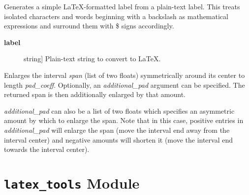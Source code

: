 \documentclass[a4paper,10pt,english]{sphinxmanual}
\begin{document}

\begin{fulllineitems}
\label{index:kafe.plot.label_to_latex}
Generates a simple LaTeX-formatted label from a plain-text label.
This treats isolated characters and words beginning with a backslash
as mathematical expressions and surround them with \$ signs accordingly.
\begin{description}
\item[{\textbf{label}}] \leavevmode{[}string{]}
Plain-text string to convert to LaTeX.

\end{description}

\end{fulllineitems}


\begin{fulllineitems}
\label{index:kafe.plot.pad_span}
Enlarges the interval \emph{span} (list of two floats) symmetrically around
its center to length \emph{pad\_coeff}. Optionally, an \emph{additional\_pad} argument
can be specified. The returned span is then additionally enlarged by that
amount.

\emph{additional\_pad} can also be a list of two floats which specifies an
asymmetric amount by which to enlarge the span. Note that in this case,
positive entries in \emph{additional\_pad} will enlarge the span (move the
interval end away from the interval center) and negative amounts will
shorten it (move the interval end towards the interval center).

\end{fulllineitems}



\section{\texttt{latex\_tools} Module}
\label{index:module-kafe.latex_tools}\label{index:latex-tools-module}\label{index:module-latex_tools}
\end{document}
